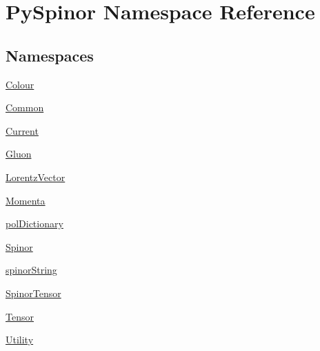 \hypertarget{namespace_py_spinor}{}\section{Py\+Spinor Namespace Reference}
\label{namespace_py_spinor}
\subsection*{Namespaces}
\begin{DoxyCompactItemize}
\item 
 \hyperlink{namespace_py_spinor_1_1_colour}{Colour}
\item 
 \hyperlink{namespace_py_spinor_1_1_common}{Common}
\item 
 \hyperlink{namespace_py_spinor_1_1_current}{Current}
\item 
 \hyperlink{namespace_py_spinor_1_1_gluon}{Gluon}
\item 
 \hyperlink{namespace_py_spinor_1_1_lorentz_vector}{Lorentz\+Vector}
\item 
 \hyperlink{namespace_py_spinor_1_1_momenta}{Momenta}
\item 
 \hyperlink{namespace_py_spinor_1_1pol_dictionary}{pol\+Dictionary}
\item 
 \hyperlink{namespace_py_spinor_1_1_spinor}{Spinor}
\item 
 \hyperlink{namespace_py_spinor_1_1spinor_string}{spinor\+String}
\item 
 \hyperlink{namespace_py_spinor_1_1_spinor_tensor}{Spinor\+Tensor}
\item 
 \hyperlink{namespace_py_spinor_1_1_tensor}{Tensor}
\item 
 \hyperlink{namespace_py_spinor_1_1_utility}{Utility}
\end{DoxyCompactItemize}
